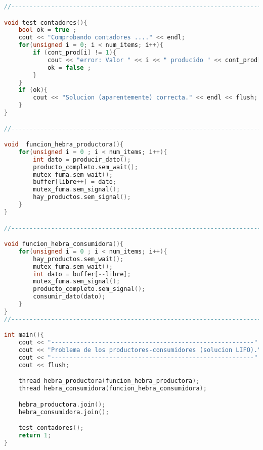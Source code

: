 \documentclass[8pt, a4paper, titlepage]{article}
\begin{document}
\begin{lstlisting}[language=C++]
//----------------------------------------------------------------------

void test_contadores(){
	bool ok = true ;
	cout << "Comprobando contadores ...." << endl;
	for(unsigned i = 0; i < num_items; i++){
		if (cont_prod[i] != 1){
			cout << "error: Valor " << i << " producido " << cont_prod[i] << " veces." << endl;
			ok = false ;
		}
	}
	if (ok){
		cout << "Solucion (aparentemente) correcta." << endl << flush;
	}
}

//----------------------------------------------------------------------

void  funcion_hebra_productora(){
	for(unsigned i = 0 ; i < num_items; i++){
		int dato = producir_dato();
		producto_completo.sem_wait();
		mutex_fuma.sem_wait();
		buffer[libre++] = dato;
		mutex_fuma.sem_signal();
		hay_productos.sem_signal();
	}
}

//----------------------------------------------------------------------

void funcion_hebra_consumidora(){
	for(unsigned i = 0 ; i < num_items; i++){
		hay_productos.sem_wait();
		mutex_fuma.sem_wait();
		int dato = buffer[--libre];
		mutex_fuma.sem_signal();
		producto_completo.sem_signal();
		consumir_dato(dato);
	}
}
//----------------------------------------------------------------------

int main(){
	cout << "--------------------------------------------------------" << endl;
	cout << "Problema de los productores-consumidores (solucion LIFO)." << endl;
	cout << "--------------------------------------------------------" << endl;
	cout << flush;

	thread hebra_productora(funcion_hebra_productora);
	thread hebra_consumidora(funcion_hebra_consumidora);

	hebra_productora.join();
	hebra_consumidora.join();

	test_contadores();
	return 1;
}


\end{lstlisting}
\end{document}

